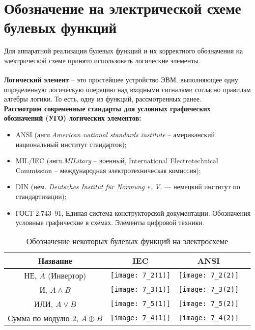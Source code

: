 \section{Обозначение на электрической схеме булевых функций}
Для аппаратной реализации булевых функций и их корректного обозначения на электрической схеме принято использовать логические элементы.
\\
\\\textbf{Логический элемент} – это простейшее устройство ЭВМ, выполняющее одну определенную логическую операцию над входными сигналами согласно правилам алгебры логики. То есть, одну из функций, рассмотренных ранее.\\
\textbf{Рассмотрим современные стандарты для условных графических обозначений (УГО) логических элементов:}

\begin{itemize}
  \item ANSI (англ.\emph{American national standards institute} -- американский национальный институт стандартов);
  \item MIL/IEC (англ.\emph{MILitary} – военный, {International Electrotechnical Commission} -- международная электротехническая комиссия);
  \item DIN (нем. \emph{Deutsches Institut f{\"u}r Normung e. V.} — немецкий институт по стандартизации);
  \item ГОСТ 2.743--91, Единая система конструкторской документации. Обозначения условные графические в схемах. Элементы цифровой техники. 
\end{itemize}
\begin{table}[!h]
\centering
\caption{Обозначение некоторых булевых функций на электросхеме}
\begin{tabular}{|c|c|c|c|}
\hline
Название & IEC & ANSI \\
\hline
\multirow{3}{*}{НЕ, $\bar{A}$ (Инвертор)} & \multirow{3}{*}{\texttt{[image: 7\_2(1)]}} & \multirow{3}{*}{\texttt{[image: 7\_2(2)]}} \\
& & \\
& & \\
\hline
\multirow{3}{*}{И, $A \wedge B$} & \multirow{3}{*}{\texttt{[image: 7\_3(1)]}} & \multirow{3}{*}{\texttt{[image: 7\_3(2)]}} \\
& & \\
& & \\
\hline
\multirow{3}{*}{ИЛИ, $A \vee B$} & \multirow{3}{*}{\texttt{[image: 7\_5(1)]}} & \multirow{3}{*}{\texttt{[image: 7\_5(2)]}} \\
& & \\
& & \\
\hline
\multirow{3}{*}{Сумма по модулю 2, $A \oplus B$} & \multirow{3}{*}{\texttt{[image: 7\_4(1)]}} & \multirow{3}{*}{\texttt{[image: 7\_4(2)]}} \\
& & \\
& & \\
\hline
\end{tabular}

\end{table}
